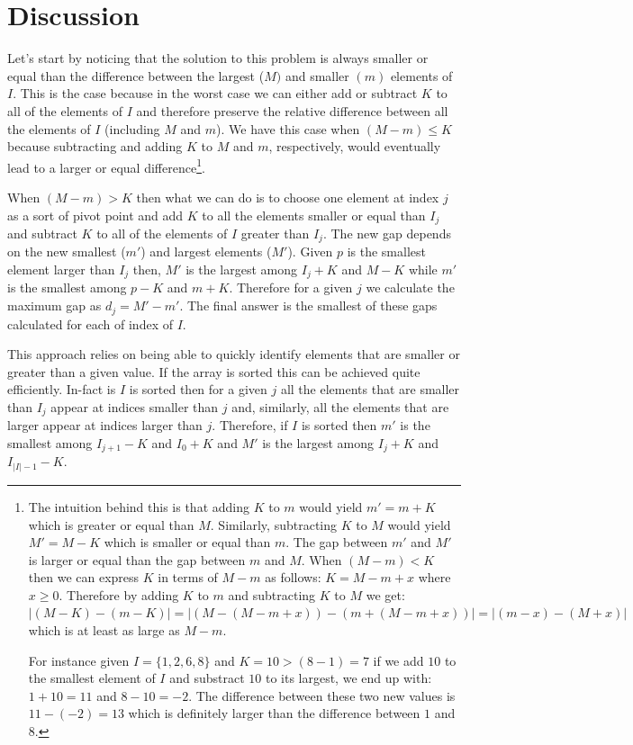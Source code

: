 \section{Discussion}
\label{smallest_range:sec:discussion}
Let's start by noticing that the solution to this problem is always smaller or equal 
than the difference between the largest ($M)$ and smaller  $(m)$ elements of $I$.
This is the case because in the worst case we can either add or subtract $K$ to all of the elements of $I$
and therefore preserve the relative difference between all the elements of $I$ (including $M$ and $m$).
We have this case when $(M-m) \leq K$ because subtracting and adding $K$ to $M$ and $m$, respectively, would
eventually lead to a larger or equal difference\footnote{The intuition behind this is that 
adding $K$ to $m$ would yield $m' = m+K$ which is greater or equal than $M$.
Similarly, subtracting $K$ to $M$ would yield $M' = M-K$ which is smaller or equal than $m$.
The gap between $m'$ and $M'$ is larger or equal than the gap between $m$ and $M$. 
When $(M-m) < K$ then we can express $K$ in terms of $M-m$ as follows: $K = M-m + x$ where $x \geq 0$.
Therefore by adding $K$ to $m$ and subtracting $K$ to $M$ we get:
$|(M-K) - (m-K)| = |(M-(M-m + x)) - (m + (M-m + x))| = |(m-x) - (M+x)|$
which is at least as large as $M-m$.

For instance given $I = \{1,2,6,8\}$ and $K = 10 > (8-1) = 7$ 
if we add $10$ to the smallest element of $I$ and substract $10$ to its largest,
we end up with: $1+10 = 11$ and $8-10=-2$. The difference between these two new values is $11-(-2) = 13$ which is definitely larger than the difference between $1$ and $8$.
}.

When $(M-m) > K$ then what we can do is to choose one element at index $j$ as a sort of pivot point and 
add $K$ to all the elements smaller or equal than $I_j$ and subtract $K$ to all of the elements of $I$ greater than $I_j$.
The new gap depends on the new smallest ($m'$) and largest elements ($M'$).
Given $p$ is the smallest element larger than $I_j$ then,
$M'$ is the largest among $I_j+K$ and $M-K$ while $m'$ is the smallest among $p - K$ and $m+K$.
Therefore for a given $j$ we calculate the maximum gap as $d_j = M'-m'$.
The final answer is the smallest of these gaps calculated for each of index of $I$.

This approach relies on being able to quickly identify elements
that are smaller or greater than a given value. 
If the array is sorted this can be achieved quite efficiently.
In-fact is $I$ is sorted then for a given $j$ all the elements that are smaller than $I_j$ appear at indices smaller than $j$ and, similarly,
all the elements that are larger appear at indices larger than $j$. 
Therefore, if $I$ is sorted then $m'$ is the smallest among $I_{j+1}-K$ and $I_0 +K$
and $M'$ is the largest among $I_j+K$ and $I_{|I|-1}-K$.





